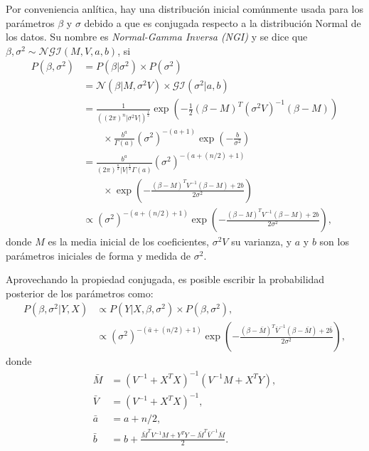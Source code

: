 Por conveniencia anl\'itica, hay una distribuci\'on inicial com\'unmente usada para los par\'ametros $\beta$ y $\sigma$ debido a que es conjugada respecto a la distribuci\'on Normal de los datos. Su nombre es \textit{Normal-Gamma Inversa (NGI)} y se dice que $\beta,\sigma^2 \sim \mathcal{NGI}(M,V,a,b)$, si
\begin{equation*}
\begin{aligned}
    P(\beta,\sigma^2) 
    &= P(\beta|\sigma^2) \times P(\sigma^2) \\
    &= \mathcal{N}(\beta|M, \sigma^2 V) \times \mathcal{GI}(\sigma ^2|a,b) \\
    &= \frac{1}{((2\pi)^n|\sigma^2 V|)^\frac{1}{2}}
       \exp\left(-\frac{1}{2}(\beta-M)^T{(\sigma^2 V)}^{-1}(\beta-M)\right) \\
    &  \text{ }\text{ }\text{ } \times
       \frac{b^a}{\Gamma(a)}(\sigma^2)^{-(a+1)}\exp\left(-\frac{b}{\sigma^2}\right) \\
    &= \frac{b^a}{(2\pi)^\frac{n}{2}{|V|}^\frac{1}{2}\Gamma(a)}(\sigma^2)^{-(a+    (n/2)+1)} \\
    & \text{ }\text{ }\text{ } \times
      \exp\left(-\frac{(\beta-M)^TV^{-1}(\beta-M) + 2b}{2\sigma^2}\right) \\
    &\propto (\sigma^2)^{-(a+(n/2)+1)} \exp\left(-\frac{(\beta-M)^TV^{-1}(\beta-M) + 2b}{2\sigma^2}\right),
\end{aligned}
\end{equation*}
donde $M$ es la media inicial de los coeficientes, $\sigma^2 V$ su varianza, y $a$ y $b$ son los par\'ametros iniciales de forma y medida de $\sigma ^2$. 

Aprovechando la propiedad conjugada, es posible escribir la probabilidad posterior de los par\'ametros como:
\begin{equation*}
\begin{aligned}
    P(\beta,\sigma^2 | Y, X) 
    &\propto P(Y| X, \beta, \sigma^2) \times P(\beta, \sigma^2), \\
    &\propto (\sigma^2)^{-(\bar{a}+(n/2)+1)} \exp\left(-\frac{(\beta-\bar{M})^T\bar{V}^{-1}(\beta-\bar{M}) + 2\bar{b}}{2\sigma^2}\right),
\end{aligned}
\end{equation*}
donde
\begin{equation*}
\begin{aligned}
    \bar{M} &= (V^{-1} + X^TX)^{-1} (V^{-1}M + X^TY), \\
    \bar{V} &= (V^{-1} + X^TX)^{-1}, \\
    \bar{a} &= a + n/2, \\
    \bar{b} &= b + \frac{\bar{M}^TV^{-1}M + Y^TY - \bar{M}^T\bar{V}^{-1}\bar{M}}{2}.
\end{aligned}
\end{equation*}

